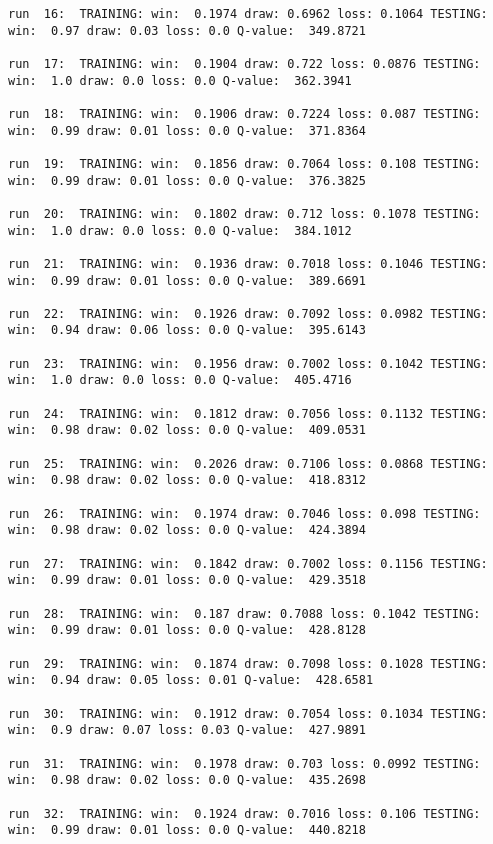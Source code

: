 \documentclass[11pt]{article}
\begin{document}
\begin{Verbatim}[commandchars=\\\{\}]
run  16:  TRAINING: win:  0.1974 draw: 0.6962 loss: 0.1064 TESTING: win:  0.97 draw: 0.03 loss: 0.0 Q-value:  349.8721

run  17:  TRAINING: win:  0.1904 draw: 0.722 loss: 0.0876 TESTING: win:  1.0 draw: 0.0 loss: 0.0 Q-value:  362.3941

run  18:  TRAINING: win:  0.1906 draw: 0.7224 loss: 0.087 TESTING: win:  0.99 draw: 0.01 loss: 0.0 Q-value:  371.8364

run  19:  TRAINING: win:  0.1856 draw: 0.7064 loss: 0.108 TESTING: win:  0.99 draw: 0.01 loss: 0.0 Q-value:  376.3825

run  20:  TRAINING: win:  0.1802 draw: 0.712 loss: 0.1078 TESTING: win:  1.0 draw: 0.0 loss: 0.0 Q-value:  384.1012

run  21:  TRAINING: win:  0.1936 draw: 0.7018 loss: 0.1046 TESTING: win:  0.99 draw: 0.01 loss: 0.0 Q-value:  389.6691

run  22:  TRAINING: win:  0.1926 draw: 0.7092 loss: 0.0982 TESTING: win:  0.94 draw: 0.06 loss: 0.0 Q-value:  395.6143

run  23:  TRAINING: win:  0.1956 draw: 0.7002 loss: 0.1042 TESTING: win:  1.0 draw: 0.0 loss: 0.0 Q-value:  405.4716

run  24:  TRAINING: win:  0.1812 draw: 0.7056 loss: 0.1132 TESTING: win:  0.98 draw: 0.02 loss: 0.0 Q-value:  409.0531

run  25:  TRAINING: win:  0.2026 draw: 0.7106 loss: 0.0868 TESTING: win:  0.98 draw: 0.02 loss: 0.0 Q-value:  418.8312

run  26:  TRAINING: win:  0.1974 draw: 0.7046 loss: 0.098 TESTING: win:  0.98 draw: 0.02 loss: 0.0 Q-value:  424.3894

run  27:  TRAINING: win:  0.1842 draw: 0.7002 loss: 0.1156 TESTING: win:  0.99 draw: 0.01 loss: 0.0 Q-value:  429.3518

run  28:  TRAINING: win:  0.187 draw: 0.7088 loss: 0.1042 TESTING: win:  0.99 draw: 0.01 loss: 0.0 Q-value:  428.8128

run  29:  TRAINING: win:  0.1874 draw: 0.7098 loss: 0.1028 TESTING: win:  0.94 draw: 0.05 loss: 0.01 Q-value:  428.6581

run  30:  TRAINING: win:  0.1912 draw: 0.7054 loss: 0.1034 TESTING: win:  0.9 draw: 0.07 loss: 0.03 Q-value:  427.9891

run  31:  TRAINING: win:  0.1978 draw: 0.703 loss: 0.0992 TESTING: win:  0.98 draw: 0.02 loss: 0.0 Q-value:  435.2698

run  32:  TRAINING: win:  0.1924 draw: 0.7016 loss: 0.106 TESTING: win:  0.99 draw: 0.01 loss: 0.0 Q-value:  440.8218


\end{Verbatim}
\end{document}
